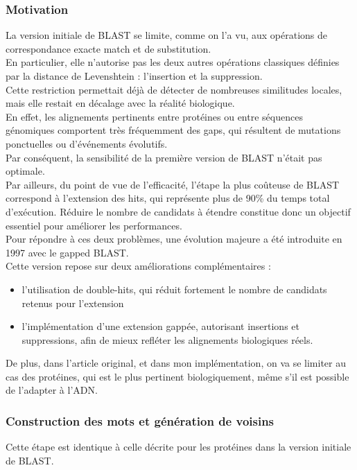 \documentclass[conference]{IEEEtran}
\begin{document}
\subsubsection{Motivation}
La version initiale de BLAST se limite, comme on l’a vu, aux opérations de correspondance exacte match et de substitution.\\
En particulier, elle n’autorise pas les deux autres opérations classiques définies par la distance de Levenshtein : l’insertion et la suppression.\\
Cette restriction permettait déjà de détecter de nombreuses similitudes locales, mais elle restait en décalage avec la réalité biologique.\\
En effet, les alignements pertinents entre protéines ou entre séquences génomiques comportent très fréquemment des gaps, qui résultent de mutations ponctuelles ou d’événements évolutifs.\\
Par conséquent, la sensibilité de la première version de BLAST n’était pas optimale.\\
Par ailleurs, du point de vue de l’efficacité, l’étape la plus coûteuse de BLAST correspond à l’extension des hits, qui représente plus de 90\% du temps total d’exécution. Réduire le nombre de candidats à étendre constitue donc un objectif essentiel pour améliorer les performances.\\
Pour répondre à ces deux problèmes, une évolution majeure a été introduite en 1997 avec le gapped BLAST.\\
Cette version repose sur deux améliorations complémentaires :
\begin{itemize}
\item l’utilisation de double-hits, qui réduit fortement le nombre de candidats retenus pour l’extension
\item l’implémentation d’une extension gappée, autorisant insertions et suppressions, afin de mieux refléter les alignements biologiques réels.
\end{itemize}
De plus, dans l'article original, et dans mon implémentation, on va se limiter au cas des protéines, qui est le plus pertinent biologiquement, même s'il est possible de l'adapter à l'ADN.
\subsubsection{Construction des mots et génération de voisins}
Cette étape est identique à celle décrite pour les protéines dans la version initiale de BLAST.
\end{document}
